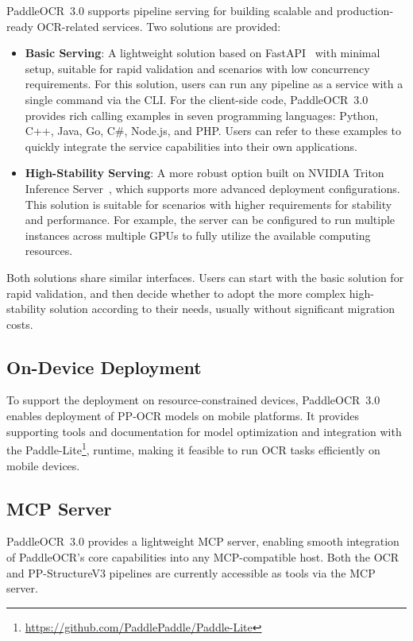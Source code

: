 \documentclass[11pt, a4paper, logo, copyright, nonumbering]{paddleocr}
\begin{document}
PaddleOCR~3.0 supports pipeline serving for building scalable and production-ready OCR-related services. Two solutions are provided:

\begin{itemize}
  \item \textbf{Basic Serving}: A lightweight solution based on FastAPI~\citep{fastapi} with minimal setup, suitable for rapid validation and scenarios with low concurrency requirements. For this solution, users can run any pipeline as a service with a single command via the CLI. For the client-side code, PaddleOCR~3.0 provides rich calling examples in seven programming languages: Python, C++, Java, Go, C\#, Node.js, and PHP. Users can refer to these examples to quickly integrate the service capabilities into their own applications.
  \item \textbf{High-Stability Serving}: A more robust option built on NVIDIA Triton Inference Server~\citep{tritoninference}, which supports more advanced deployment configurations. This solution is suitable for scenarios with higher requirements for stability and performance. For example, the server can be configured to run multiple instances across multiple GPUs to fully utilize the available computing resources.
\end{itemize}

Both solutions share similar interfaces. Users can start with the basic solution for rapid validation, and then decide whether to adopt the more complex high-stability solution according to their needs, usually without significant migration costs.

\subsection{On-Device Deployment}

To support the deployment on resource-constrained devices, PaddleOCR~3.0 enables deployment of PP-OCR models on mobile platforms. It provides supporting tools and documentation for model optimization and integration with the Paddle-Lite\footnote{\url{https://github.com/PaddlePaddle/Paddle-Lite}}, runtime, making it feasible to run OCR tasks efficiently on mobile devices.

\subsection{MCP Server}

PaddleOCR~3.0 provides a lightweight MCP server, enabling smooth integration of PaddleOCR’s core capabilities into any MCP-compatible host. Both the OCR and PP-StructureV3 pipelines are currently accessible as tools via the MCP server.
\end{document}
